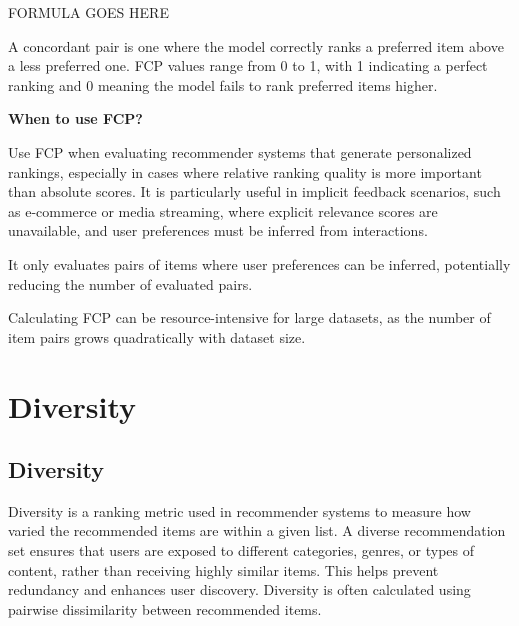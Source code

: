 \begin{center}
    FORMULA GOES HERE
\end{center}

A concordant pair is one where the model correctly ranks a preferred item above a less preferred one. FCP values range from
0 to 1, with 1 indicating a perfect ranking and 0 meaning the model fails to rank preferred items higher.

\textbf{When to use FCP?}

Use FCP when evaluating recommender systems that generate personalized rankings, especially in cases where relative
ranking quality is more important than absolute scores. It is particularly useful in implicit feedback scenarios,
such as e-commerce or media streaming, where explicit relevance scores are unavailable, and user preferences must be
inferred from interactions.

{
    \item It only evaluates pairs of items where user preferences can be inferred, potentially reducing
    the number of evaluated pairs.
    \item Calculating FCP can be resource-intensive for large datasets, as the number of item pairs grows
    quadratically with dataset size.
}


\clearpage
\thispagestyle{rankingstyle}
\section{Diversity}
\subsection{Diversity}

Diversity is a ranking metric used in recommender systems to measure how varied the recommended items are within a given list.
A diverse recommendation set ensures that users are exposed to different categories, genres, or types of content, rather than
receiving highly similar items. This helps prevent redundancy and enhances user discovery. Diversity is often calculated using
pairwise dissimilarity between recommended items.

